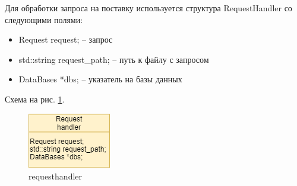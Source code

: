 Для обработки запроса на поставку используется структура RequestHandler со следующими полями: 

\begin{itemize}
    \item Request request; -- запрос
    \item std::string request\_path; -- путь к файлу с запросом
    \item DataBases *dbs; -- указатель на базы данных
\end{itemize}

Схема на рис. \ref{request_handler}.

\begin{figure}[hpt!]
    \centering
    \includegraphics[width=0.4\linewidth]{photo/request_handler}
    \caption{requesthandler}
    \label{request_handler}
\end{figure}
